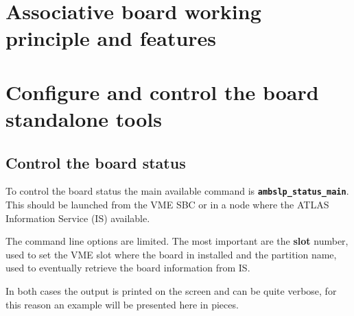 \documentclass[UKenglish]{latex/atlasdoc}
\begin{document}
\section{Associative board working principle and features}


\section{Configure and control the board standalone tools}

\subsection{Control the board status}
To control the board status the main available command is
\textbf{\texttt{ambslp\_status\_main}}. This should be
launched from the VME SBC or in a node where the ATLAS Information
Service (IS) available.

The command line options are limited. The most important are the \textbf{slot} 
number, used to set the VME slot where the board in installed and
the partition name, used to eventually retrieve the board
information from IS.

In both cases the output is printed on the screen and can be quite 
verbose, for this reason an example will be presented here in
pieces.
\end{document}
